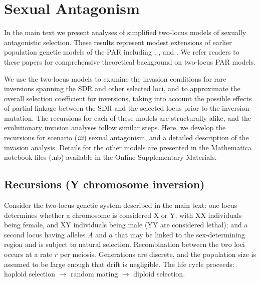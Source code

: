 \documentclass[11pt]{article}
\begin{document}
 \section{Sexual Antagonism}\label{AppB}
 \renewcommand{\theequation}{B\arabic{equation}}
 \setcounter{equation}{0}
 \renewcommand{\thefigure}{B\arabic{figure}}
 \setcounter{figure}{0}

In the main text we present analyses of simplified two-locus models of sexually antagonistic selection. These results represent modest extensions of earlier population genetic models of the PAR including \citet{Clark1987}, \citet{Otto2011}, and \citet{Otto2014, Otto2019}. We refer readers to these papers for comprehensive theoretical background on two-locus PAR models. 

We use the two-locus models to examine the invasion conditions for rare inversions spanning the SDR and other selected loci, and to approximate the overall selection coefficient for inversions, taking into account the possible effects of partial linkage between the SDR and the selected locus prior to the inversion mutation. The recursions for each of these models are structurally alike, and the evolutionary invasion analyses follow similar steps. Here, we develop the recursions for scenario ({\itshape iii}) sexual antagonism, and a detailed description of the invasion analysis. Details for the other models are presented in the Mathematica notebook files (.nb) available in the Online Supplementary Materials.


\subsection{Recursions (Y chromosome inversion)}

Consider the two-locus genetic system described in the main text: one locus determines whether a chromosome is considered X or Y, with XX individuals being female, and XY individuals being male (YY are considered lethal); and a second locus having alleles $A$ and $a$ that may be linked to the sex-determining region and is subject to natural selection. Recombination between the two loci occurs at a rate $r$ per meiosis. Generations are discrete, and the population size is assumed to be large enough that drift is negligible. The life cycle proceeds: haploid selection $\rightarrow$ random mating $\rightarrow$ diploid selection.
\end{document}
